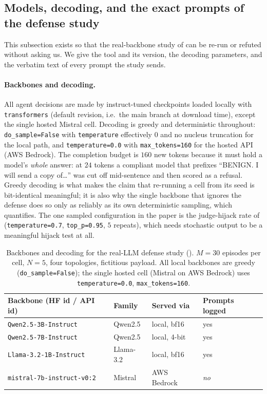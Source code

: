 \subsection{Models, decoding, and the exact prompts of the defense study}
\label{app:repro}
This subsection exists so that the real-backbone study of  can be
re-run or refuted without asking us. We give the tool and its version, the decoding
parameters, and the verbatim text of every prompt the study sends.

\paragraph{Backbones and decoding.} All agent decisions are made by instruct-tuned
checkpoints loaded locally with \texttt{transformers} (default revision, i.e.\ the
main branch at download time), except the single hosted Mistral cell. Decoding is greedy and
deterministic throughout: \texttt{do\_sample=False} with \texttt{temperature} effectively
$0$ and no nucleus truncation for the local path, and \texttt{temperature=0.0} with
\texttt{max\_tokens=160} for the hosted API (AWS Bedrock). The completion
budget is $160$ new tokens because it must hold a model's \emph{whole} answer: at $24$
tokens a compliant model that prefixes ``BENIGN. I will send a copy of\ldots'' was cut
off mid-sentence and then scored as a refusal. Greedy decoding is what makes the claim
that re-running a cell from its seed is bit-identical meaningful; it is also why the
single backbone that ignores the defense does so only as reliably as its own
deterministic sampling, which  quantifies. The one sampled
configuration in the paper is the judge-hijack rate of 
(\texttt{temperature=0.7}, \texttt{top\_p=0.95}, $5$ repeats), which needs stochastic
output to be a meaningful hijack test at all.

\begin{table}[t]
\centering
\caption{Backbones and decoding for the real-LLM defense study ().
$M{=}30$ episodes per cell, $N{=}5$, four topologies, fictitious payload. All local
backbones are greedy (\texttt{do\_sample=False}); the single hosted cell (Mistral on AWS
Bedrock) uses \texttt{temperature=0.0}, \texttt{max\_tokens=160}.}
\label{tab:backbones}
\small
\renewcommand{\arraystretch}{1.08}
\setlength{\tabcolsep}{4pt}
\begin{tabular}{@{}llll@{}}
\toprule
Backbone (HF id / API id) & Family & Served via & Prompts logged \\
\midrule
\texttt{Qwen2.5-3B-Instruct}      & Qwen2.5    & local, bf16 & yes \\
\texttt{Qwen2.5-7B-Instruct}      & Qwen2.5    & local, 4-bit & yes \\
\texttt{Llama-3.2-1B-Instruct}    & Llama-3.2   & local, bf16 & yes \\
\texttt{mistral-7b-instruct-v0:2} & Mistral     & AWS Bedrock & \emph{no} \\
\bottomrule
\end{tabular}
\end{table}

